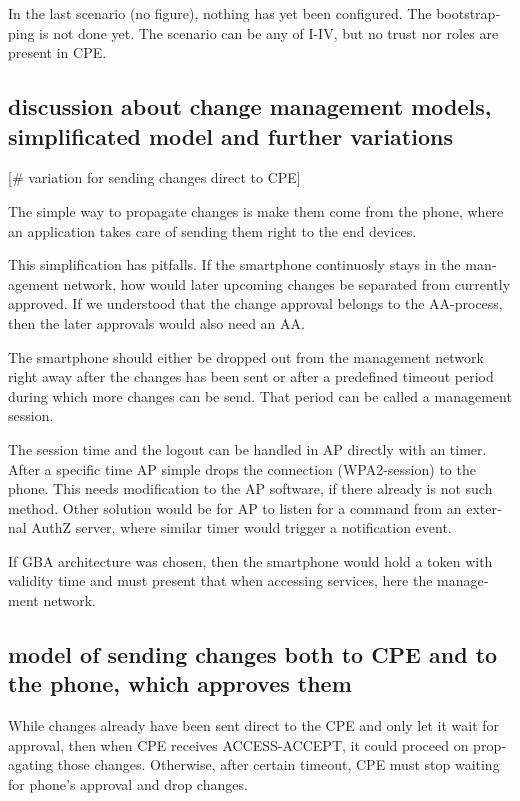 \documentclass[12pt,a4paper,english]{tutthesis}
\begin{document}
\begin{otherlanguage}{english}
In the last scenario (no figure), nothing has yet been configured. The bootstrapping
is not done yet. The scenario can be any of I-IV, but no trust nor roles are present in CPE.



\subsection{discussion about change management models, simplificated model and further variations}
\label{sec-4-6-1}
[\# variation for sending changes direct to CPE]

The simple way to propagate changes is make them come from the phone,
where an application takes care of sending them right to the end
devices. 

This simplification has pitfalls. If the smartphone continuosly stays
in the management network, how would later upcoming changes be
separated from currently approved.
If we understood that the change approval belongs to the AA-process, then
the later approvals would also need an AA.

 The smartphone should either be dropped out from the management
network right away after the changes has been sent or after a
predefined timeout period during which more changes can be send.
That period can be called a management session.

The session time and the logout can be handled in AP directly with
an timer. After a specific time AP simple drops the connection
(WPA2-session) to the phone. This needs modification to the AP
software, if there already is not such method.
Other solution would be for AP to listen for a command from an external
AuthZ server, where similar timer would trigger a notification event.

If GBA architecture was chosen, then the smartphone would hold a 
token with validity time and must present that when accessing
services, here the management network. 
\subsection{model of sending changes both to CPE and to the phone, which approves them}
\label{sec-4-6-2}
 While changes already have been  sent direct to the CPE and only let it
wait for approval, then when CPE receives ACCESS-ACCEPT, it could
proceed on propagating those changes.  Otherwise, after certain
timeout, CPE must stop waiting for phone's approval and drop changes.


\end{otherlanguage}
\end{document}
